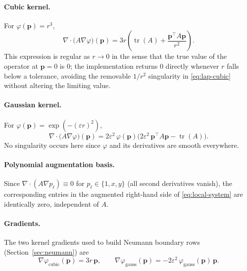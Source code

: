 \documentclass[11pt]{article}
\newcommand{\bp}{\mathbf{p}}
\newcommand{\diver}{\nabla\!\cdot}
\newcommand{\grad}{\nabla}
\begin{document}
\paragraph{Cubic kernel.} For $\varphi(\bp) = r^3$,
\begin{equation}
  \diver\!\big(A\grad\varphi\big)(\bp)
  = 3r\left(\operatorname{tr}(A) + \frac{\bp^\top A \bp}{r^2}\right).
  \label{eq:lap-cubic}
\end{equation}
This expression is regular as $r \to 0$ in the sense that the
true value of the operator at $\bp=0$ is $0$; the implementation
returns $0$ directly whenever $r$ falls below a tolerance, avoiding
the removable $1/r^2$ singularity in \eqref{eq:lap-cubic} without
altering the limiting value.

\paragraph{Gaussian kernel.} For $\varphi(\bp) =
\exp(-(\varepsilon r)^2)$,
\begin{equation}
  \diver\!\big(A\grad\varphi\big)(\bp)
  = 2\varepsilon^2\,\varphi(\bp)
  \Big(2\varepsilon^2\, \bp^\top A \bp - \operatorname{tr}(A)\Big).
  \label{eq:lap-gauss}
\end{equation}
No singularity occurs here since $\varphi$ and its derivatives are
smooth everywhere.

\paragraph{Polynomial augmentation basis.} Since
$\diver(A\grad p_\ell) \equiv 0$ for $p_\ell \in \{1,x,y\}$ (all
second derivatives vanish), the corresponding entries in the augmented
right-hand side of \eqref{eq:local-system} are identically zero,
independent of $A$.

\paragraph{Gradients.} The two kernel gradients used to build Neumann
boundary rows (Section~\ref{sec:neumann}) are
\begin{equation}
  \grad\varphi_{\text{cubic}}(\bp) = 3r\,\bp,
  \qquad
  \grad\varphi_{\text{gauss}}(\bp) = -2\varepsilon^2\,\varphi_{\text{gauss}}(\bp)\,\bp.
  \label{eq:grad-kernels}
\end{equation}
\end{document}
